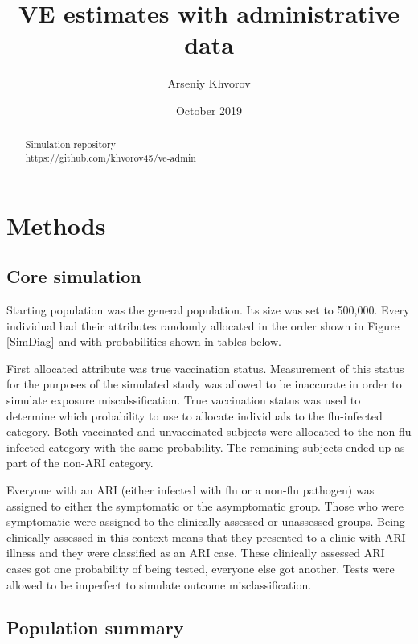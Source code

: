 \documentclass[11pt]{article}
\title{VE estimates with administrative data}
\author{Arseniy Khvorov}
\date{October 2019}
\begin{document}
\maketitle

\renewcommand{\abstractname}{}
\begin{abstract}
	\begin{center}
	Simulation repository\\
	https://github.com/khvorov45/ve-admin
	\end{center}
\end{abstract}

\tableofcontents

\pagebreak

%
\section{Methods}

\subsection{Core simulation}

Starting population was the general population. Its size was set to 500,000. Every individual had their attributes randomly allocated in the order shown in Figure \ref{SimDiag} and with probabilities shown in tables below.

First allocated attribute was true vaccination status. Measurement of this status for the purposes of the simulated study was allowed to be inaccurate in order to simulate exposure miscalssification. True vaccination status was used to determine which probability to use to allocate individuals to the flu-infected category. Both vaccinated and unvaccinated subjects were allocated to the non-flu infected category with the same probability. The remaining subjects ended up as part of the non-ARI category.

Everyone with an ARI (either infected with flu or a non-flu pathogen) was assigned to either the symptomatic or the asymptomatic group. Those who were symptomatic were assigned to the clinically assessed or unassessed groups. Being clinically assessed in this context means that they presented to a clinic with ARI illness and they were classified as an ARI case. These clinically assessed ARI cases got one probability of being tested, everyone else got another. Tests were allowed to be imperfect to simulate outcome misclassification.

\subsection{Population summary}
\end{document}
